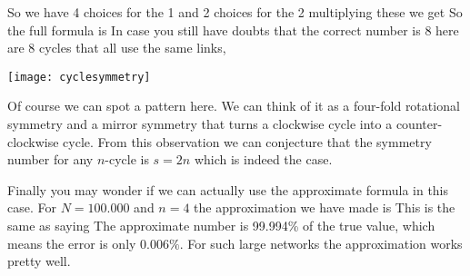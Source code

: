 So we have 4 choices for the 1 and 2 choices for the 2 multiplying these we get
So the full formula is 
In case you still have doubts that the correct number is 8 here are 8 cycles that all use the same links,
\begin{center}
\texttt{[image: cyclesymmetry]}
\end{center}
Of course we can spot a pattern here. We can think of it as a four-fold rotational symmetry and a mirror symmetry that turns a clockwise cycle into a counter-clockwise cycle. From this observation we can conjecture that the symmetry number for any $n$-cycle is $s=2n$ which is indeed the case. 

Finally you may wonder if we can actually use the approximate formula in this case. For $N=100.000$ and $n=4$ the approximation we have made is 
This is the same as saying 
The approximate number is 99.994\% of the true value, which means the error is only $0.006\%$. For such large networks the approximation works pretty well.  